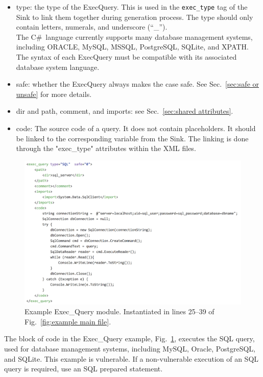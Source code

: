 \documentclass[12pt]{article}
\newcommand{\CSharp}{C{\fontseries{b}\selectfont\#}}
\begin{document}
\begin{itemize}
    \item type: the type of the ExecQuery. This is used in the
    \verb|exec_type| tag of the Sink to link them together during
    generation process.  The type should only contain letters, numerals, and
    underscore (``\_'').\\
    The \CSharp\ language currently supports many database management
    systems, including ORACLE, MySQL, MSSQL, PostgreSQL, SQLite, and XPATH.
    The syntax of each ExecQuery must be
    compatible with its associated database system language.
    
    \item safe: whether the ExecQuery always makes the case safe.
    See Sec.~\ref{sec:safe or unsafe} for more details.

    \item dir and path, comment, and imports: see Sec.~\ref{sec:shared attributes}.

    \item code: The source code of a query. It does not contain placeholders.
    It should be linked to the corresponding variable from the Sink. The linking is done through the "exec\_type" attributes within the XML files.
\end{itemize}


\begin{figure}[htbp]
  \includegraphics[width=\linewidth]{fig_Exec_Query_file.png}
  \caption{Example Exec\_Query module. Instantiated in lines 25--39 of
    Fig.~\ref{fig:example main file}.}
  \label{fig:example exec-query file}
\end{figure}

The block of code in the Exec\_Query example, 
Fig.~\ref{fig:example exec-query file}, executes the SQL query, used 
for database management
systems, including MySQL, Oracle, PostgreSQL, and SQLite.  This example is
vulnerable.  If a non-vulnerable execution of an SQL query is required,
use an SQL prepared statement.
\end{document}
